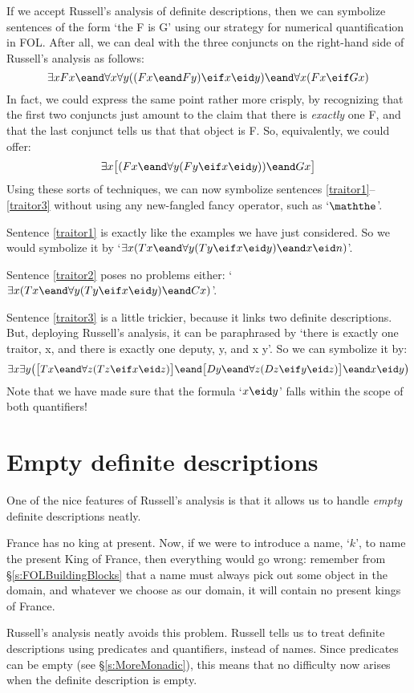 If we accept Russell's analysis of definite descriptions, then we can symbolize sentences of the form `the F is G' using our strategy for numerical quantification in FOL. After all, we can deal with the three conjuncts on the right-hand side of Russell's analysis as follows:
	$$\exists x Fx \eand \forall x \forall y ((Fx \eand Fy) \eif x \eid y) \eand \forall x (Fx \eif Gx)$$
In fact, we could express the same point rather more crisply, by recognizing that the first two conjuncts just amount to the claim that there is \emph{exactly} one F, and that the last conjunct tells us that that object is F. So, equivalently, we could offer:
	$$\exists x \bigl[(Fx \eand \forall y (Fy \eif x \eid y)) \eand Gx\bigr]$$
Using these sorts of techniques, we can now symbolize sentences \ref{traitor1}--\ref{traitor3} without using any new-fangled fancy operator, such as `$\maththe$'.

Sentence \ref{traitor1} is exactly like the examples we have just considered. So we would symbolize it by `$\exists x (Tx \eand \forall y(Ty \eif x \eid y) \eand x \eid n)$'.

Sentence \ref{traitor2} poses no problems either: `$\exists x (Tx \eand \forall y(Ty \eif x \eid y) \eand Cx)$'.

Sentence \ref{traitor3} is a little trickier, because it links two definite descriptions. But, deploying  Russell's analysis, it can be paraphrased by `there is exactly one traitor, x, and there is exactly one deputy, y, and x \eid  y'. So we can symbolize it by:
$$\exists x \exists y \bigl(\bigl[Tx \eand \forall z(Tz \eif x \eid z)\bigr] \eand \bigl[Dy \eand \forall z(Dz \eif y \eid z)\bigr] \eand x \eid  y\bigr)$$
Note that we have made sure that the formula `$x \eid y$' falls within the scope of both quantifiers!

\section{Empty definite descriptions}
One of the nice features of Russell's analysis is that it allows us to handle \emph{empty} definite descriptions neatly.

France has no king at present. Now, if we were to introduce a name, `$k$', to name the present King of France, then everything would go wrong: remember from \S\ref{s:FOLBuildingBlocks} that a name must always pick out  some object in the domain, and whatever we choose as our domain, it will contain no present kings of France.

Russell's analysis neatly avoids this problem. Russell tells us to treat definite descriptions using predicates and quantifiers, instead of names. Since predicates can be empty (see \S\ref{s:MoreMonadic}), this means that no difficulty now arises when the definite description is empty.

